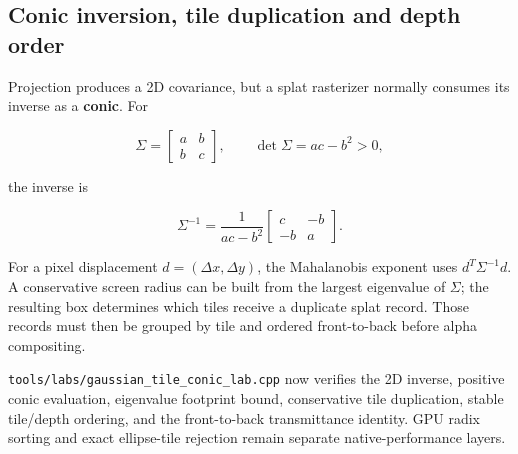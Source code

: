 \subsection{Conic inversion, tile duplication and depth order}\label{appendix-24269cb6977c-conic-inversion-tile-duplication-and-depth-order}

Projection produces a 2D covariance, but a splat rasterizer normally consumes its inverse as a \textbf{conic}. For

\[
\Sigma=
\begin{bmatrix}
a&b\\
b&c
\end{bmatrix},
\qquad
\det\Sigma=ac-b^2>0,
\]

the inverse is

\[
\Sigma^{-1}
=
\frac{1}{ac-b^2}
\begin{bmatrix}
c&-b\\
-b&a
\end{bmatrix}.
\]

For a pixel displacement \(d=(\Delta x,\Delta y)\), the Mahalanobis exponent uses \(d^T\Sigma^{-1}d\). A conservative screen radius can be built from the largest eigenvalue of \(\Sigma\); the resulting box determines which tiles receive a duplicate splat record. Those records must then be grouped by tile and ordered front-to-back before alpha compositing.

\texttt{tools/labs/gaussian\_tile\_conic\_lab.cpp} now verifies the 2D inverse, positive conic evaluation, eigenvalue footprint bound, conservative tile duplication, stable tile/depth ordering, and the front-to-back transmittance identity. GPU radix sorting and exact ellipse-tile rejection remain separate native-performance layers.
